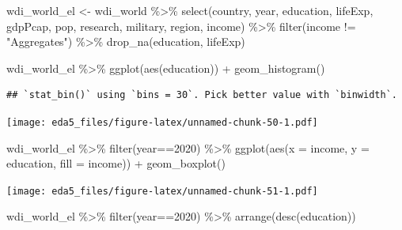 \documentclass[
]{article}
\newenvironment{Shaded}{\begin{snugshade}}{\end{snugshade}}
\newcommand{\AttributeTok}[1]{\textcolor[rgb]{0.77,0.63,0.00}{#1}}
\newcommand{\DecValTok}[1]{\textcolor[rgb]{0.00,0.00,0.81}{#1}}
\newcommand{\FunctionTok}[1]{\textcolor[rgb]{0.00,0.00,0.00}{#1}}
\newcommand{\NormalTok}[1]{#1}
\newcommand{\OtherTok}[1]{\textcolor[rgb]{0.56,0.35,0.01}{#1}}
\newcommand{\SpecialCharTok}[1]{\textcolor[rgb]{0.00,0.00,0.00}{#1}}
\newcommand{\StringTok}[1]{\textcolor[rgb]{0.31,0.60,0.02}{#1}}
\begin{document}
\begin{Shaded}
\begin{Highlighting}[]
\NormalTok{wdi\_world\_el }\OtherTok{\textless{}{-}}\NormalTok{ wdi\_world }\SpecialCharTok{\%\textgreater{}\%} \FunctionTok{select}\NormalTok{(country, year, education, lifeExp, gdpPcap, pop, research, military, region, income) }\SpecialCharTok{\%\textgreater{}\%} \FunctionTok{filter}\NormalTok{(income }\SpecialCharTok{!=} \StringTok{"Aggregates"}\NormalTok{) }\SpecialCharTok{\%\textgreater{}\%} \FunctionTok{drop\_na}\NormalTok{(education, lifeExp)}
\end{Highlighting}
\end{Shaded}

\begin{Shaded}
\begin{Highlighting}[]
\NormalTok{wdi\_world\_el }\SpecialCharTok{\%\textgreater{}\%} \FunctionTok{ggplot}\NormalTok{(}\FunctionTok{aes}\NormalTok{(education)) }\SpecialCharTok{+} \FunctionTok{geom\_histogram}\NormalTok{()}
\end{Highlighting}
\end{Shaded}

\begin{verbatim}
## `stat_bin()` using `bins = 30`. Pick better value with `binwidth`.
\end{verbatim}

\texttt{[image: eda5\_files/figure-latex/unnamed-chunk-50-1.pdf]}

\begin{Shaded}
\begin{Highlighting}[]
\NormalTok{wdi\_world\_el }\SpecialCharTok{\%\textgreater{}\%} \FunctionTok{filter}\NormalTok{(year}\SpecialCharTok{==}\DecValTok{2020}\NormalTok{) }\SpecialCharTok{\%\textgreater{}\%} \FunctionTok{ggplot}\NormalTok{(}\FunctionTok{aes}\NormalTok{(}\AttributeTok{x =}\NormalTok{ income, }\AttributeTok{y =}\NormalTok{ education, }\AttributeTok{fill =}\NormalTok{ income)) }\SpecialCharTok{+} \FunctionTok{geom\_boxplot}\NormalTok{()}
\end{Highlighting}
\end{Shaded}

\texttt{[image: eda5\_files/figure-latex/unnamed-chunk-51-1.pdf]}

\begin{Shaded}
\begin{Highlighting}[]
\NormalTok{wdi\_world\_el }\SpecialCharTok{\%\textgreater{}\%} \FunctionTok{filter}\NormalTok{(year}\SpecialCharTok{==}\DecValTok{2020}\NormalTok{) }\SpecialCharTok{\%\textgreater{}\%} \FunctionTok{arrange}\NormalTok{(}\FunctionTok{desc}\NormalTok{(education))}
\end{Highlighting}
\end{Shaded}
\end{document}
